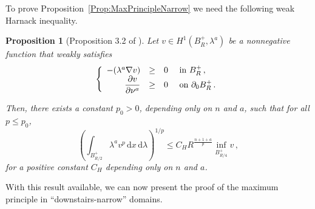 \documentclass[12pt,reqno]{amsart}
\newtheorem{proposition}[theorem]{Proposition}
\theoremstyle{definition}
\theoremstyle{remark}
\renewcommand{\d}{\,\mathrm{d}} %
\newcommand{\dx}{\,\mathrm{d}x} %
\newcommand\beqc[1]{\left\{\begin{array}{#1}}
\newcommand\eeqc{\end{array} \right.}
\def\PDEsystem{rcll}
\let\div\relax
\DeclareMathOperator{\div}{div}
\numberwithin{equation}{section}
\begin{document}
To prove Proposition~\ref{Prop:MaxPrincipleNarrow} we need the following weak Harnack inequality.

\begin{proposition}[Proposition 3.2 of \cite{TanXiong}]
\label{Prop:WeakHarnack}
Let $v \in H^1(B_R^+, \lambda^a)$ be a nonnegative function that weakly satisfies 
$$
\beqc{\PDEsystem}
-\div(\lambda^a \nabla v) &\geq& 0 & \textrm{ in } B_R^+\,, \\
\dfrac{\partial v}{\partial \nu^a} &\geq & 0 & \textrm{ on }  \partial_0 B_R^+\,.
\eeqc
$$

Then, there exists a constant $p_0 > 0$, depending only on $n$ and $a$, such that for all $p\leq p_0$,
\begin{equation}
\label{Eq:WeakHarnack}
\left( \int_{B_{R/2}^+} \lambda^a v^p \dx \d \lambda \right )^{1/p} \leq C_H R^{\frac{n+1+a}{p} } \inf_{B^+_{R/4}} v\,,
\end{equation}
for a positive constant $C_H$ depending only on $n$ and $a$.
\end{proposition}

With this result available, we can now present the proof of the maximum principle in ``downstairs-narrow'' domains.
\end{document}
